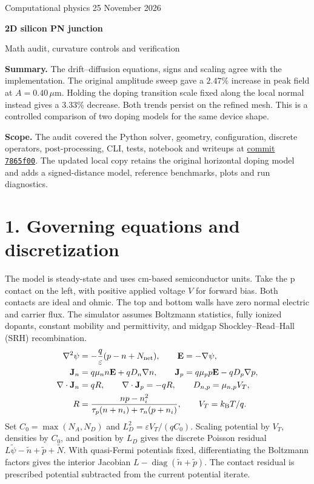 \documentclass[11pt,a4paper]{article}
\newcommand{\um}{\,\mu\mathrm{m}}
\begin{document}
\thispagestyle{plain}
{\large\color{accent} Computational physics \hfill 25 November 2026\par}
\vspace{5mm}
{\Huge\bfseries\color{ink} 2D silicon PN junction\par}
\vspace{2mm}
{\Large\color{muted} Math audit, curvature controls and verification\par}
\vspace{4mm}

\textbf{Summary.} The drift--diffusion equations, signs and scaling agree
with the implementation. The original amplitude sweep gave a \(2.47\%\)
increase in peak field at \(A=0.40\um\). Holding the doping transition
scale fixed along the local normal instead gives a \(3.33\%\) decrease.
Both trends persist on the refined mesh. This is a controlled comparison
of two doping models for the same device shape.

\textbf{Scope.} The audit covered the Python solver, geometry, configuration,
discrete operators, post-processing, CLI, tests, notebook and writeups at
\href{https://github.com/johntheseegler/pn-junction-sim/tree/7865f004aefdff5889c56161ae058d7ed4d330b7}{commit \texttt{7865f00}}.
The updated local copy retains the original horizontal doping model and
adds a signed-distance model, reference benchmarks, plots and run diagnostics.

\section*{1. Governing equations and discretization}
The model is steady-state and uses cm-based semiconductor units.
Take the p contact on the left, with positive applied voltage \(V\) for
forward bias. Both contacts are ideal and ohmic. The top and bottom walls
have zero normal electric and carrier flux. The simulator assumes
Boltzmann statistics, fully ionized dopants, constant mobility and
permittivity, and midgap Shockley--Read--Hall (SRH) recombination.
\begin{align*}
\nabla^2\psi &=-\frac{q}{\varepsilon}(p-n+N_{\rm net}),\qquad
  \mathbf E=-\nabla\psi,\\
\mathbf J_n &=q\mu_n n\mathbf E+qD_n\nabla n,\qquad
\mathbf J_p=q\mu_p p\mathbf E-qD_p\nabla p,\\
\nabla\cdot\mathbf J_n &=qR,\qquad \nabla\cdot\mathbf J_p=-qR,\qquad
D_{n,p}=\mu_{n,p}V_T,\\
R&=\frac{np-n_i^2}{\tau_p(n+n_i)+\tau_n(p+n_i)},\qquad
V_T=k_{\mathrm B}T/q .
\end{align*}
Set \(C_0=\max(N_A,N_D)\) and \(L_D^2=\varepsilon V_T/(qC_0)\).
Scaling potential by \(V_T\), densities by \(C_0\), and position by \(L_D\)
gives the discrete Poisson residual \(L\tilde\psi-\tilde n+\tilde p+\tilde N\).
With quasi-Fermi potentials fixed, differentiating the Boltzmann factors
gives the interior Jacobian \(L-\operatorname{diag}(\tilde n+\tilde p)\).
The contact residual is prescribed potential subtracted from the
current potential iterate.
\end{document}
